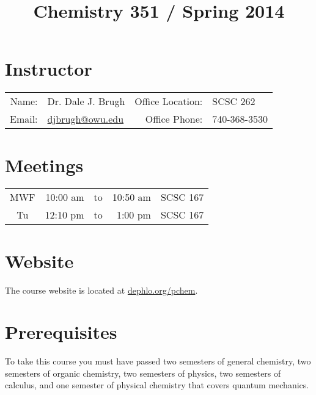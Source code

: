 \documentclass[letterpaper,oneside,onecolumn,11pt,article]{memoir}
\title{Chemistry 351 / Spring 2014}
\date{}
\author{}
\begin{document}
\maketitle
\thispagestyle{courseinformationtitle}

\section{Instructor}
\begin{tabular}{rl|rl}
Name: & Dr. Dale J. Brugh & Office Location: & SCSC 262 \\
Email: & \href{mailto:djbrugh@owu.edu}{djbrugh@owu.edu} & Office Phone: & 740-368-3530 \\
\end{tabular}

\section{Meetings}
\begin{tabular}{crcrl}
MWF & 10:00 am & to & 10:50 am & SCSC 167\\
Tu & 12:10 pm & to & 1:00 pm & SCSC 167 \\
\end{tabular}

\section{Website}
The course website is located at \href{http://dephlo.org/pchem}{dephlo.org/pchem}.

\section{Prerequisites}
To take this course you must have passed two semesters of general chemistry, two semesters of organic chemistry, two semesters of physics, two semesters of calculus, and one semester of physical chemistry that covers quantum mechanics.
\end{document}
